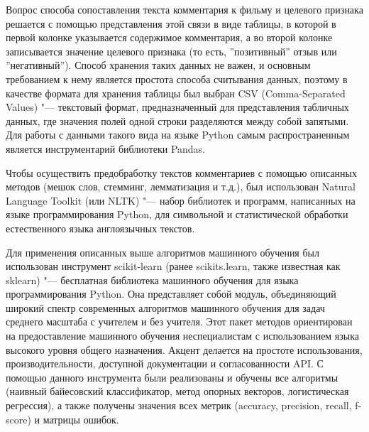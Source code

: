 \documentclass[bachelor, och, coursework]{SCWorks}
\begin{document}
        Вопрос способа сопоставления текста комментария к фильму и целевого
        признака решается с помощью представления этой связи в виде таблицы, в
        которой в первой колонке указывается содержимое комментария, а во второй
        колонке записывается значение целевого признака (то есть, ''позитивный''
        отзыв или ''негативный''). Способ хранения таких данных не важен, и
        основным требованием к нему является простота способа считывания данных,
        поэтому в качестве формата для хранения таблицы был выбран CSV
        (Comma-Separated Values) "--- текстовый формат, предназначенный для
        представления табличных данных, где значения полей одной строки
        разделяются между собой запятыми. Для работы с данными такого вида на
        языке Python самым распространенным является инструментарий библиотеки
        Pandas.

        Чтобы осуществить предобработку текстов комментариев с помощью описанных
        методов (мешок слов, стемминг, лемматизация и т.д.), был использован
        Natural Language Toolkit (или NLTK) "--- набор библиотек и программ,
        написанных на языке программирования Python, для символьной и
        статистической обработки естественного языка англоязычных текстов. 

        Для применения описанных выше алгоритмов машинного обучения был
        использован инструмент scikit-learn (ранее scikits.learn, также
        известная как sklearn) "--- бесплатная библиотека машинного обучения для
        языка программирования Python. Она представляет собой модуль,
        объединяющий широкий спектр современных алгоритмов машинного обучения
        для задач среднего масштаба с учителем и без учителя. Этот пакет методов
        ориентирован на предоставление машинного обучения неспециалистам с
        использованием языка высокого уровня общего назначения. Акцент делается
        на простоте использования, производительности, доступной документации и
        согласованности API. С помощью данного инструмента были реализованы и
        обучены все алгоритмы (наивный байесовский классификатор, метод опорных
        векторов, логистическая регрессия), а также получены значения всех
        метрик (accuracy, precision, recall, f-score) и матрицы ошибок.
\end{document}
